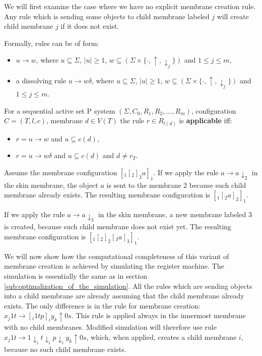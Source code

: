 \documentclass[llncs,submission,copyright,creativecommons]{../lib/lncs/llncs}
\begin{document}
We will first examine the case where we have no explicit membrane creation rule. Any rule which is sending some objects to child membrane labeled $j$ will create child membrane $j$ if it does not exist.

Formally, rules can be of form:
\begin{itemize}
  \item $u\rightarrow w$, where $u\subseteq \Sigma$, $|u|\geq 1$, $w\subseteq (\Sigma\times\{\cdot, \uparrow, \downarrow_j\})$ and $1\leq j\leq m$,
  \item a dissolving rule $u\rightarrow w\delta$, where $u\subseteq \Sigma$, $|u|\geq 1$, $w\subseteq (\Sigma\times\{\cdot, \uparrow, \downarrow_j\})$ and $1\leq j\leq m$.
\end{itemize}

For a sequential active set P system $(\Sigma, C_0, R_1, R_2, \dots , R_m)$, configuration $C = (T, l, c)$, membrane $d\in V(T)$ the rule $r\in R_{l(d)}$ is {\bf applicable} iff:
\begin{itemize}
  \item $r = u\rightarrow w$ and $u\subseteq c(d)$,
  \item $r = u\rightarrow w\delta$ and $u\subseteq c(d)$ and $d\neq r_T$.
\end{itemize}

\begin{example}
  Assume the membrane configuration $[_1 [_2 ]_2 a ]_1$. If we apply the rule $a \rightarrow a\downarrow_2$ in the skin membrane, the object $a$ is sent to the membrane 2 because such child membrane already exists. The resulting membrane configuration is $[_1 [_2 a ]_2 ]_1$.

  If we apply the rule $a \rightarrow a\downarrow_3$ in the skin membrane, a new membrane labeled 3 is created, because such child membrane does not exist yet. The resulting membrane configuration is $[_1 [_2 ]_2 [_3 a ]_3 ]_1$.
\end{example}

We will now show how the computational completeness of this variant of membrane creation is achieved by simulating the register machine. The simulation is essentially the same as in section \ref{sub:optimalization_of_the_simulation}. All the rules which are sending objects into a child membrane are already assuming that the child membrane already exists. The only difference is in the rule for membrane creation: $x_j1t \rightarrow [_i 1tp]_iy_k\uparrow 0s$. This rule is applied always in the innermost membrane with no child membranes. Modified simulation will therefore use rule $x_j1t \rightarrow 1\downarrow_i t\downarrow_i p\downarrow_i y_k\uparrow 0s$, which, when applied, creates a child membrane $i$, because no such child membrane exists.
\end{document}
